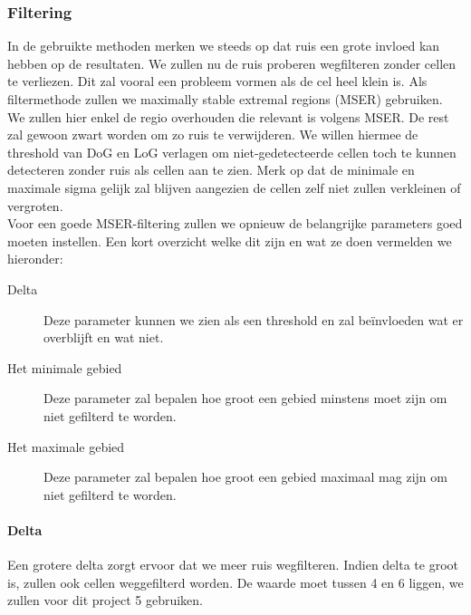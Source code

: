 \documentclass{article}
\begin{document}
\begin{multicols}{2}
\subsubsection{Filtering}
In de gebruikte methoden merken we steeds op dat ruis een grote invloed kan hebben op de resultaten. We zullen nu de ruis proberen wegfilteren zonder cellen te verliezen. Dit zal vooral een probleem vormen als de cel heel klein is. Als filtermethode zullen we maximally stable extremal regions (MSER) \cite{ref_MSER} gebruiken. We zullen hier enkel de regio overhouden die relevant is volgens MSER. De rest zal gewoon zwart worden om zo ruis te verwijderen. We willen hiermee de threshold van DoG en LoG verlagen om niet-gedetecteerde cellen toch te kunnen detecteren zonder ruis als cellen aan te zien. Merk op dat de minimale en maximale sigma gelijk zal blijven aangezien de cellen zelf niet zullen verkleinen of vergroten. \\
Voor een goede MSER-filtering zullen we opnieuw de belangrijke parameters goed moeten instellen. Een kort overzicht welke dit zijn en wat ze doen vermelden we hieronder:
\begin{description}
   \item[Delta] Deze parameter kunnen we zien als een threshold en zal beïnvloeden wat er overblijft en wat niet.
   \item[Het minimale gebied] Deze parameter zal bepalen hoe groot een gebied minstens moet zijn om niet gefilterd te worden.
   \item[Het maximale gebied] Deze parameter zal bepalen hoe groot een gebied maximaal mag zijn om niet gefilterd te worden.
\end{description}

\paragraph{Delta}
Een grotere delta zorgt ervoor dat we meer ruis wegfilteren. Indien delta te groot is, zullen ook cellen weggefilterd worden. De waarde moet tussen 4 en 6 liggen, we zullen voor dit project 5 gebruiken.


\end{multicols}
\end{document}
